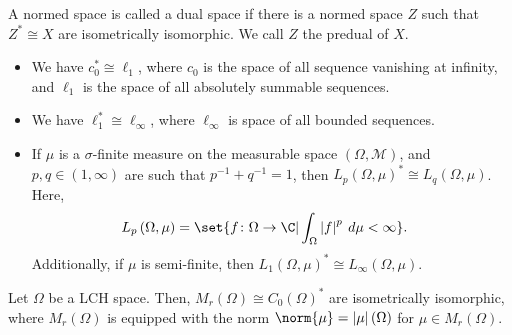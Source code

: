 \begin{definition}
  A normed space is called a dual space if there is a normed space $Z$ such that $Z^{\ast} \cong X$ are isometrically isomorphic. We call $Z$ the predual of $X$.
\end{definition}
\begin{example}\hfill
  \begin{itemize}
    \item We have $c_0^{\ast}\cong \ell_1$, where $c_0$ is the space of all sequence vanishing at infinity, and $\ell_1$ is the space of all absolutely summable sequences.
    \item We have $\ell_1^{\ast}\cong \ell_{\infty}$, where $\ell_{\infty}$ is space of all bounded sequences.
    \item If $\mu$ is a $\sigma$-finite measure on the measurable space $\left(\Omega,\mathcal{M}\right)$, and $p,q\in (1,\infty)$ are such that $p^{-1} + q^{-1} = 1$, then $L_{p}\left(\Omega,\mu\right)^{\ast} \cong L_q\left(\Omega,\mu\right)$. Here,
      \begin{align*}
        L_p\left(\Omega,\mu\right) &= \set{f\colon \Omega\rightarrow \C | \int_{\Omega}^{} \left\vert f \right\vert^p\:d\mu < \infty}.
      \end{align*}
      Additionally, if $\mu$ is semi-finite, then $L_1\left(\Omega,\mu\right)^{\ast}\cong L_{\infty}\left(\Omega,\mu\right)$.
  \end{itemize}
\end{example}
\begin{theorem}
  Let $\Omega$ be a LCH space. Then, $M_r\left(\Omega\right) \cong C_0\left(\Omega\right)^{\ast}$ are isometrically isomorphic, where $M_r\left(\Omega\right)$ is equipped with the norm $\norm{\mu} = \left\vert \mu \right\vert\left(\Omega\right)$ for $\mu\in M_r\left(\Omega\right)$.
\end{theorem}

